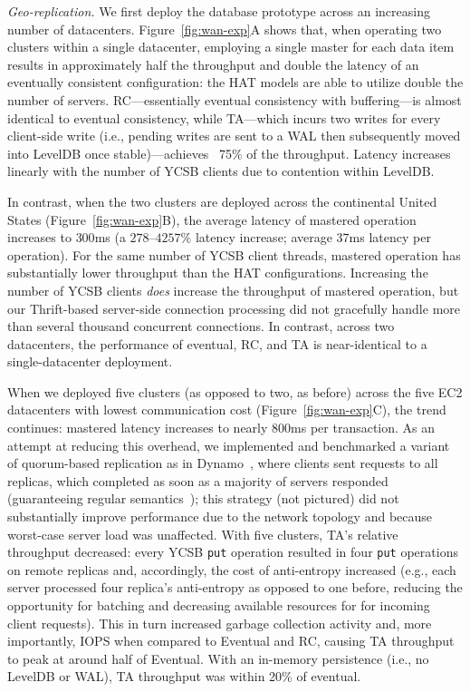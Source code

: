 \vspace{.5em}\noindent\textit{Geo-replication.} We first deploy the
database prototype across an increasing number of
datacenters. Figure~\ref{fig:wan-exp}A shows that, when operating two
clusters within a single datacenter, employing a single master for
each data item results in approximately half the throughput and double
the latency of an eventually consistent configuration: the HAT models
are able to utilize double the number of servers. RC---essentially
eventual consistency with buffering---is almost identical to eventual
consistency, while TA---which incurs two writes for every client-side
write (i.e., pending writes are sent to a WAL then subsequently moved
into LevelDB once stable)---achieves ~75\% of the
throughput. Latency increases linearly with the number of YCSB clients
due to contention within LevelDB.

 In contrast, when the two clusters are deployed across the
 continental United States (Figure~\ref{fig:wan-exp}B), the average
 latency of mastered operation increases to $300$ms (a $278$--$4257\%$
 latency increase; average $37$ms latency per operation). For the same
 number of YCSB client threads, mastered operation has substantially
 lower throughput than the HAT configurations. Increasing the number
 of YCSB clients \textit{does} increase the throughput of mastered
 operation, but our Thrift-based server-side connection processing did
 not gracefully handle more than several thousand concurrent
 connections. In contrast, across two datacenters, the performance of
 eventual, RC, and TA is near-identical to a single-datacenter
 deployment.

When we deployed five clusters (as opposed to two, as before) across
the five EC2 datacenters with lowest communication cost
(Figure~\ref{fig:wan-exp}C), the trend continues: mastered latency
increases to nearly $800$ms per transaction. As an attempt at reducing
this overhead, we implemented and benchmarked a variant of
quorum-based replication as in Dynamo~\cite{dynamo}, where clients
sent requests to all replicas, which completed as soon as a majority
of servers responded (guaranteeing regular
semantics~\cite{herlihy-art}); this strategy (not pictured) did not
substantially improve performance due to the network topology and
because worst-case server load was unaffected. With five clusters,
TA's relative throughput decreased: every YCSB \texttt{put} operation
resulted in four \texttt{put} operations on remote replicas and,
accordingly, the cost of anti-entropy increased (e.g., each server
processed four replica's anti-entropy as opposed to one before,
reducing the opportunity for batching and decreasing available
resources for for incoming client requests). This in turn increased
garbage collection activity and, more importantly, IOPS when compared
to Eventual and RC, causing TA throughput to peak at around half of
Eventual. With an in-memory persistence (i.e., no LevelDB or WAL), TA
throughput was within 20\% of eventual.

